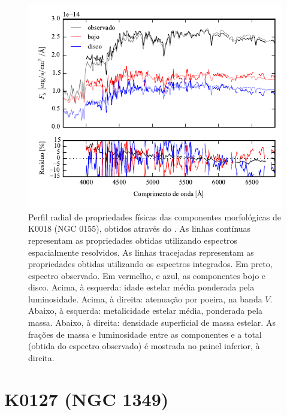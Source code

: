 \begin{figure}
	\includegraphics[page=2]{figuras/sample006a_synthesis}
	\caption[Propriedades físicas das componentes morfológicas de K0018 (NGC 0155)]
	{Perfil radial de propriedades físicas das componentes morfológicas de
	K0018 (NGC 0155), obtidos através do \starlight. As linhas contínuas
	representam as propriedades obtidas utilizando espectros espacialmente
	resolvidos. As linhas tracejadas representam as propriedades obtidas utilizando
	os espectros integrados. Em preto, espectro observado. Em vermelho, e azul, as
	componentes bojo e disco. Acima, à esquerda: idade estelar média ponderada pela
	luminosidade. Acima, à direita: atenuação por poeira, na banda $V$. Abaixo, à
	esquerda: metalicidade estelar média, ponderada pela massa. Abaixo, à direita:
	densidade superficial de massa estelar. As frações de massa e luminosidade
	entre as componentes e a total (obtida do espectro observado) é mostrada no
	painel inferior, à direita.}
	\label{fig:decompSinteseRadprof:K0018}
\end{figure}

\FloatBarrier


\section{K0127 (NGC 1349)}
\label{apendice:Decomp:K0127}

